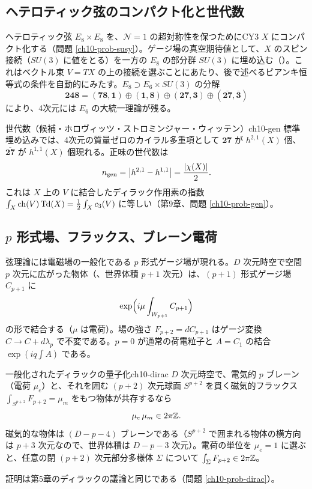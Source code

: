 \subsection{ヘテロティック弦のコンパクト化と世代数}
ヘテロティック弦 $E_8\times E_8$ を、$\mathcal N=1$ の超対称性を保つためにCY3 $X$ にコンパクト化する（問題 \ref{ch10-prob-susy}）。ゲージ場の真空期待値として、$X$ のスピン接続（$SU(3)$ に値をとる）を一方の $E_8$ の部分群 $SU(3)$ に埋め込む（）。これはベクトル束 $V=TX$ の上の接続を選ぶことにあたり、後で述べるビアンキ恒等式の条件を自動的にみたす。$E_8\supset E_6\times SU(3)$ の分解
\[
\mathbf{248}=(\mathbf{78},\mathbf 1)\oplus(\mathbf 1,\mathbf 8)\oplus(\mathbf{27},\mathbf 3)\oplus(\overline{\mathbf{27}},\overline{\mathbf 3})
\]
により、4次元には $E_6$ の大統一理論が残る。

\begin{mythm}{世代数（候補・ホロヴィッツ・ストロミンジャー・ウィッテン）}{ch10-gen}
標準埋め込みでは、4次元の質量ゼロのカイラル多重項として $\mathbf{27}$ が $h^{2,1}(X)$ 個、$\overline{\mathbf{27}}$ が $h^{1,1}(X)$ 個現れる。正味の世代数は
\[
n_{\rm gen}=\bigl\lvert h^{2,1}-h^{1,1}\bigr\rvert=\frac{\lvert\chi(X)\rvert}{2}.
\]
これは $X$ 上の $V$ に結合したディラック作用素の指数 $\int_X\operatorname{ch}(V)\operatorname{Td}(X)=\tfrac12\int_Xc_3(V)$ に等しい（第9章、問題 \ref{ch10-prob-gen}）。
\end{mythm}

\subsection{$p$ 形式場、フラックス、ブレーン電荷}
弦理論には電磁場の一般化である $p$ 形式ゲージ場が現れる。$D$ 次元時空で空間 $p$ 次元に広がった物体（、世界体積 $p+1$ 次元）は、$(p+1)$ 形式ゲージ場 $C_{p+1}$ に
\[
\exp\Bigl(i\mu\int_{W_{p+1}}C_{p+1}\Bigr)
\]
の形で結合する（$\mu$ は電荷）。場の強さ $F_{p+2}=dC_{p+1}$ はゲージ変換 $C\to C+d\lambda_p$ で不変である。$p=0$ が通常の荷電粒子と $A=C_1$ の結合 $\exp(iq\int A)$ である。

\begin{mythm}{一般化されたディラックの量子化}{ch10-dirac}
$D$ 次元時空で、電気的 $p$ ブレーン（電荷 $\mu_e$）と、それを囲む $(p+2)$ 次元球面 $S^{p+2}$ を貫く磁気的フラックス $\int_{S^{p+2}}F_{p+2}=\mu_m$ をもつ物体が共存するなら
\[
\mu_e\,\mu_m\in2\pi\mathbb{Z} .
\]
磁気的な物体は $(D-p-4)$ ブレーンである（$S^{p+2}$ で囲まれる物体の横方向は $p+3$ 次元なので、世界体積は $D-p-3$ 次元）。電荷の単位を $\mu_e=1$ に選ぶと、任意の閉 $(p+2)$ 次元部分多様体 $\Sigma$ について $\int_\Sigma F_{p+2}\in2\pi\mathbb{Z}$。
\end{mythm}
証明は第5章のディラックの議論と同じである（問題 \ref{ch10-prob-dirac}）。

